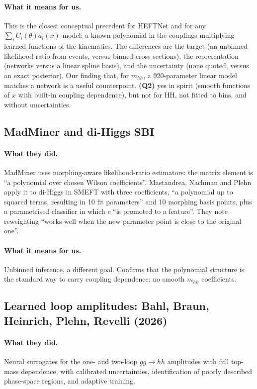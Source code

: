 \paragraph{What it means for us.} This is the closest conceptual precedent for HEFTNet and
for any $\sum_i C_i(\theta)a_i(x)$ model: a known polynomial in the couplings multiplying
learned functions of the kinematics. The differences are the target (an unbinned likelihood
ratio from events, versus binned cross sections), the representation (networks versus a
linear spline basis), and the uncertainty (none quoted, versus an exact posterior). Our
finding that, for $m_{hh}$, a 920-parameter linear model matches a network is a useful
counterpoint. \textbf{(Q2)} yes in spirit (smooth functions of $x$ with built-in coupling
dependence), but not for HH, not fitted to bins, and without uncertainties.

\subsection{MadMiner \cite{Brehmer2018} and di-Higgs SBI \cite{Mastandrea2024}}

\paragraph{What they did.} MadMiner uses morphing-aware likelihood-ratio estimators: the
matrix element is ``a polynomial over chosen Wilson coefficients''. Mastandrea, Nachman and
Plehn apply it to di-Higgs in SMEFT with three coefficients, ``a polynomial up to squared
terms, resulting in 10 fit parameters'' and 10 morphing basis points, plus a parametrised
classifier in which $c$ ``is promoted to a feature''. They note reweighting ``works well when
the new parameter point is close to the original one''.

\paragraph{What it means for us.} Unbinned inference, a different goal. Confirms that the
polynomial structure is the standard way to carry coupling dependence; no smooth $m_{hh}$
coefficients.

\subsection{Learned loop amplitudes: Bahl, Braun, Heinrich, Plehn, Revelli (2026) \cite{Bahl2026}}

\paragraph{What they did.} Neural surrogates for the one- and two-loop $gg\to hh$ amplitudes
with full top-mass dependence, with calibrated uncertainties, identification of poorly
described phase-space regions, and adaptive training.

